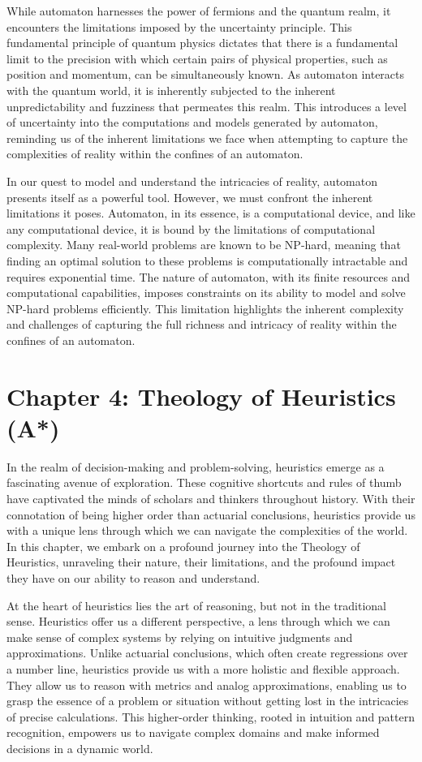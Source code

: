 \documentclass[ebook,12pt,oneside,openany]{memoir}
\begin{document}
\indent 	While automaton harnesses the power of fermions and the quantum realm, it encounters the limitations imposed by the uncertainty principle. This fundamental principle of quantum physics dictates that there is a fundamental limit to the precision with which certain pairs of physical properties, such as position and momentum, can be simultaneously known. As automaton interacts with the quantum world, it is inherently subjected to the inherent unpredictability and fuzziness that permeates this realm. This introduces a level of uncertainty into the computations and models generated by automaton, reminding us of the inherent limitations we face when attempting to capture the complexities of reality within the confines of an automaton.

\indent 	In our quest to model and understand the intricacies of reality, automaton presents itself as a powerful tool. However, we must confront the inherent limitations it poses. Automaton, in its essence, is a computational device, and like any computational device, it is bound by the limitations of computational complexity. Many real-world problems are known to be NP-hard, meaning that finding an optimal solution to these problems is computationally intractable and requires exponential time. The nature of automaton, with its finite resources and computational capabilities, imposes constraints on its ability to model and solve NP-hard problems efficiently. This limitation highlights the inherent complexity and challenges of capturing the full richness and intricacy of reality within the confines of an automaton.
\chapter*{Chapter 4: Theology of Heuristics (A*)}


\indent \indent In the realm of decision-making and problem-solving, heuristics emerge as a fascinating avenue of exploration. These cognitive shortcuts and rules of thumb have captivated the minds of scholars and thinkers throughout history. With their connotation of being higher order than actuarial conclusions, heuristics provide us with a unique lens through which we can navigate the complexities of the world. In this chapter, we embark on a profound journey into the Theology of Heuristics, unraveling their nature, their limitations, and the profound impact they have on our ability to reason and understand.

\indent At the heart of heuristics lies the art of reasoning, but not in the traditional sense. Heuristics offer us a different perspective, a lens through which we can make sense of complex systems by relying on intuitive judgments and approximations. Unlike actuarial conclusions, which often create regressions over a number line, heuristics provide us with a more holistic and flexible approach. They allow us to reason with metrics and analog approximations, enabling us to grasp the essence of a problem or situation without getting lost in the intricacies of precise calculations. This higher-order thinking, rooted in intuition and pattern recognition, empowers us to navigate complex domains and make informed decisions in a dynamic world.
\end{document}
